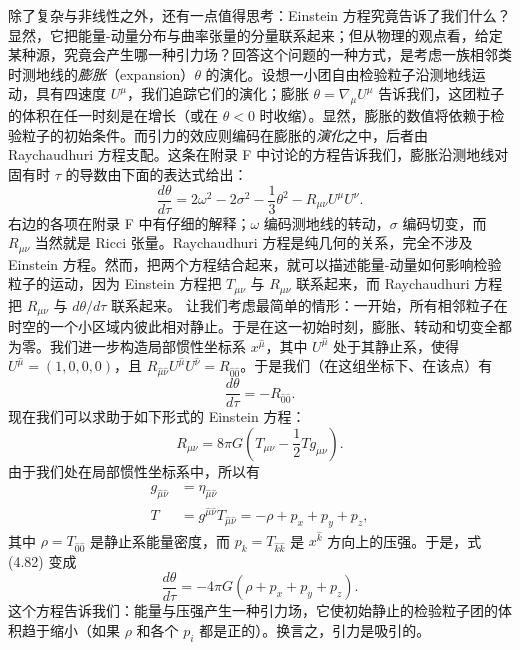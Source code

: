 除了复杂与非线性之外，还有一点值得思考：Einstein 方程究竟告诉了我们什么？显然，它把能量-动量分布与曲率张量的分量联系起来；但从物理的观点看，给定某种源，究竟会产生哪一种引力场？回答这个问题的一种方式，是考虑一族相邻类时测地线的\emph{膨胀}（expansion）$\theta$ 的演化。设想一小团自由检验粒子沿测地线运动，具有四速度 $U^\mu$，我们追踪它们的演化；膨胀 $\theta=\nabla_\mu U^\mu$ 告诉我们，这团粒子的体积在任一时刻是在增长（或在 $\theta<0$ 时收缩）。显然，膨胀的数值将依赖于检验粒子的初始条件。而引力的效应则编码在膨胀的\emph{演化}之中，后者由 Raychaudhuri 方程支配。这条在附录 F 中讨论的方程告诉我们，膨胀沿测地线对固有时 $\tau$ 的导数由下面的表达式给出：
\begin{equation*}
\frac{d\theta}{d\tau} = 2\omega^2 - 2\sigma^2 - \frac{1}{3}\theta^2 - R_{\mu\nu}U^\mu U^\nu.
\tag{4.81}
\end{equation*}
右边的各项在附录 F 中有仔细的解释；$\omega$ 编码测地线的转动，$\sigma$ 编码切变，而 $R_{\mu\nu}$ 当然就是 Ricci 张量。Raychaudhuri 方程是纯几何的关系，完全不涉及 Einstein 方程。然而，把两个方程结合起来，就可以描述能量-动量如何影响检验粒子的运动，因为 Einstein 方程把 $T_{\mu\nu}$ 与 $R_{\mu\nu}$ 联系起来，而 Raychaudhuri 方程把 $R_{\mu\nu}$ 与 $d\theta/d\tau$ 联系起来。
让我们考虑最简单的情形：一开始，所有相邻粒子在时空的一个小区域内彼此相对静止。于是在这一初始时刻，膨胀、转动和切变全都为零。我们进一步构造局部惯性坐标系 $x^{\hat\mu}$，其中 $U^{\hat\mu}$ 处于其静止系，使得 $U^{\hat\mu}=(1,0,0,0)$，且 $R_{\hat\mu\hat\nu}U^{\hat\mu}U^{\hat\nu}=R_{\hat 0\hat 0}$。于是我们（在这组坐标下、在该点）有
\begin{equation*}
\frac{d\theta}{d\tau} = -R_{\hat 0\hat 0}.
\tag{4.82}
\end{equation*}
现在我们可以求助于如下形式的 Einstein 方程：
\begin{equation*}
R_{\mu\nu} = 8\pi G\left(T_{\mu\nu}-\frac{1}{2}Tg_{\mu\nu}\right).
\tag{4.83}
\end{equation*}
由于我们处在局部惯性坐标系中，所以有
\begin{align*}
g_{\hat\mu\hat\nu} &= \eta_{\hat\mu\hat\nu} \tag{4.84}\\
T &= g^{\hat\mu\hat\nu}T_{\hat\mu\hat\nu} = -\rho + p_x + p_y + p_z, \tag{4.85}
\end{align*}
其中 $\rho=T_{\hat 0\hat 0}$ 是静止系能量密度，而 $p_k=T_{\hat k\hat k}$ 是 $x^{\hat k}$ 方向上的压强。于是，式 (4.82) 变成
\begin{equation*}
\frac{d\theta}{d\tau} = -4\pi G(\rho + p_x + p_y + p_z).
\tag{4.86}
\end{equation*}
这个方程告诉我们：能量与压强产生一种引力场，它使初始静止的检验粒子团的体积趋于缩小（如果 $\rho$ 和各个 $p_i$ 都是正的）。换言之，引力是吸引的。

